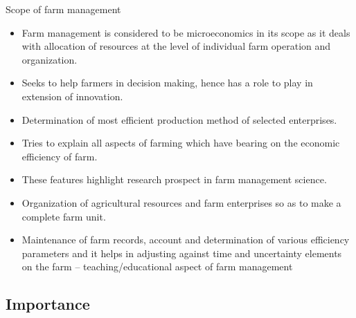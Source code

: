 \documentclass[12pt,ignorenonframetext,aspectratio=169]{beamer}
\providecommand{\tightlist}{%
  \setlength{\itemsep}{0pt}\setlength{\parskip}{0pt}}
\begin{document}
\begin{frame}{Scope of farm management}
\protect\hypertarget{scope-of-farm-management}{}

\begin{itemize}
\tightlist
\item
  Farm management is considered to be microeconomics in its scope as it
  deals with allocation of resources at the level of individual farm
  operation and organization.
\item
  Seeks to help farmers in decision making, hence has a role to play in
  extension of innovation.
\item
  Determination of most efficient production method of selected
  enterprises.
\item
  Tries to explain all aspects of farming which have bearing on the
  economic efficiency of farm.
\item
  These features highlight research prospect in farm management science.
\item
  Organization of agricultural resources and farm enterprises so as to
  make a complete farm unit.
\item
  Maintenance of farm records, account and determination of various
  efficiency parameters and it helps in adjusting against time and
  uncertainty elements on the farm -- teaching/educational aspect of
  farm management
\end{itemize}

\end{frame}

\hypertarget{importance}{%
\subsection{Importance}\label{importance}}
\end{document}
